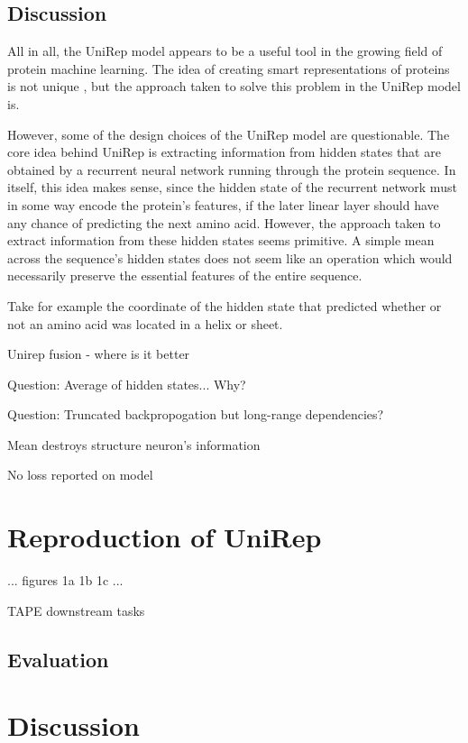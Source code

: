\documentclass[a4paper,12pt]{article}
\begin{document}
\subsection{Discussion}
All in all, the UniRep model appears to be a useful tool in the growing field of protein machine learning. The idea of creating smart representations of proteins is not unique , but the approach taken to solve this problem in the UniRep model is.

However, some of the design choices of the UniRep model are questionable. The core idea behind UniRep is extracting information from hidden states that are obtained by a recurrent neural network running through the protein sequence. In itself, this idea makes sense, since the hidden state of the recurrent network must in some way encode the protein's features, if the later linear layer should have any chance of predicting the next amino acid. However, the approach taken to extract information from these hidden states seems primitive. A simple mean across the sequence's hidden states does not seem like an operation which would necessarily preserve the essential features of the entire sequence.

Take for example the coordinate of the hidden state that predicted whether or not an amino acid was located in a helix or sheet. 

Unirep fusion - where is it better

Question: Average of hidden states... Why?

Question: Truncated backpropogation but long-range dependencies?

Mean destroys structure neuron's information

No loss reported on model

\clearpage
\section{Reproduction of UniRep}

... figures 1a 1b 1c ...

TAPE downstream tasks

\subsection{Evaluation}

\clearpage
\section{Discussion}
\end{document}
